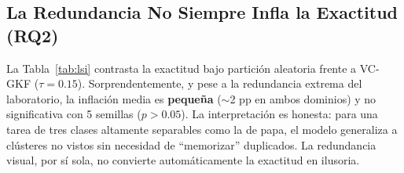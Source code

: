 \documentclass[journal,compsoc]{IEEEtran}
\begin{document}
\subsection{La Redundancia No Siempre Infla la Exactitud (RQ2)}
La Tabla~\ref{tab:lsi} contrasta la exactitud bajo partición aleatoria frente a VC-GKF ($\tau=0.15$). Sorprendentemente, y pese a la redundancia extrema del laboratorio, la inflación media es \textbf{pequeña} ($\sim$2 pp en ambos dominios) y no significativa con 5 semillas ($p>0.05$). La interpretación es honesta: para una tarea de tres clases altamente separables como la de papa, el modelo generaliza a clústeres no vistos sin necesidad de ``memorizar'' duplicados. La redundancia visual, por sí sola, no convierte automáticamente la exactitud en ilusoria.

\begin{table}[H]
\centering
\caption{Exactitud Aleatoria vs.\ VC-GKF e Índice LSI (media sobre 5 semillas)}
\label{tab:lsi}
\end{table}
\end{document}
